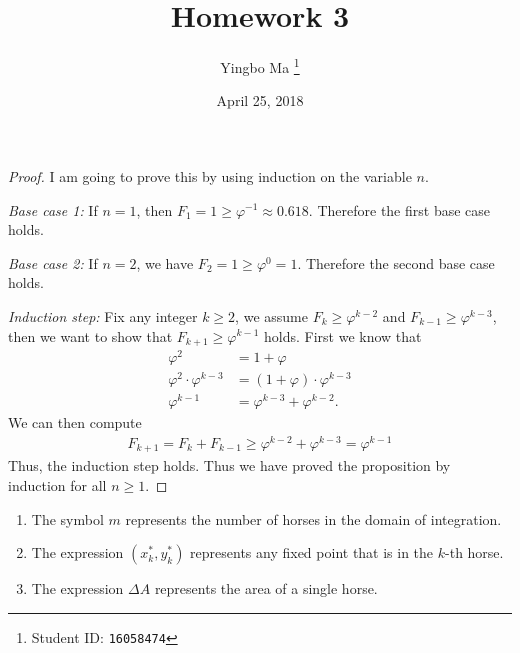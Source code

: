 \documentclass[8pt,twocolumn]{article}
\author{Yingbo Ma \thanks{Student ID: \tt{16058474}}}
\title{\vspace{-1.cm}Homework 3}
\date{April 25, 2018}
\begin{document}
\maketitle

\begin{Answer}[number=17]
\begin{proof}
  I am going to prove this by using induction on the variable $n$.

  \emph{Base case 1:} If $n=1$, then $F_1 = 1 \ge \varphi^{-1} \approx 0.618$.
  Therefore the first base case holds.

  \emph{Base case 2:} If $n=2$, we have $F_2 = 1 \ge \varphi^{0} = 1$.
  Therefore the second base case holds.

  \emph{Induction step:} Fix any integer $k\ge 2$, we assume $F_k\ge
  \varphi^{k-2}$ and $F_{k-1}\ge\varphi^{k-3}$, then we want to show that
  $F_{k+1} \ge \varphi^{k-1}$ holds. First
  we know that
  \begin{align*}
    \varphi^2 &= 1+\varphi \\
    \varphi^2\cdot\varphi^{k-3} &= (1+\varphi)\cdot\varphi^{k-3} \\
    \varphi^{k-1} &= \varphi^{k-3} + \varphi^{k-2}.
  \end{align*}
  We can then compute
  \begin{align*}
    F_{k+1} = F_k + F_{k-1} \ge \varphi^{k-2} + \varphi^{k-3} = \varphi^{k-1}
  \end{align*}
  Thus, the induction step holds. Thus we have proved the proposition by
  induction for all $n\ge 1$.
\end{proof}
\end{Answer}

\begin{Answer}[number=18]
  \begin{enumerate}
    \item The symbol $m$ represents the number of horses in the domain of
      integration.
    \item The expression $(x_k^*,y_k^*)$ represents any fixed point that is in
      the $k$-th horse.
    \item The expression $\Delta A$ represents the area of a single horse.
  \end{enumerate}
\end{Answer}
\end{document}
